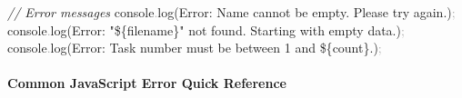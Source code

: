\documentclass[
  justified,
  openright,
]{tufte-book}
\let\subsection\paragraph
\let\paragraph\paragraph
\newcommand{\StringTok}[1]{\textcolor{CodeString}{#1}}              %
\newcommand{\CommentTok}[1]{\textcolor{CodeComment}{\textit{#1}}}  %
\newcommand{\CodeFuncTok}[1]{\textcolor{CodeKeyword}{#1}}           %
\newcommand{\OperatorTok}[1]{\textcolor{DarkGray}{#1}}              %
\newenvironment{Shaded}{%
  \begin{mdframed}[style=TufteCode]%
}{%
  \end{mdframed}%
}
\let\subsection\paragraph
\let\paragraph\paragraph
\begin{document}
\begin{Shaded}
\begin{Highlighting}[]
\CommentTok{// Error messages}
console\OperatorTok{.}\CodeFuncTok{log}(\StringTok{\textasciigrave{}Error: Name cannot be empty. Please try again.\textasciigrave{}})\OperatorTok{;}
console\OperatorTok{.}\CodeFuncTok{log}(\StringTok{\textasciigrave{}Error: "}\StringTok{\$\{}filename\StringTok{\}}\StringTok{" not found. Starting with empty data.\textasciigrave{}})\OperatorTok{;}
console\OperatorTok{.}\CodeFuncTok{log}(\StringTok{\textasciigrave{}Error: Task number must be between 1 and }\StringTok{\$\{}count\StringTok{\}}\StringTok{.\textasciigrave{}})\OperatorTok{;}
\end{Highlighting}
\end{Shaded}

\subsection{Common JavaScript Error Quick
Reference}\label{common-javascript-error-quick-reference}
\end{document}
